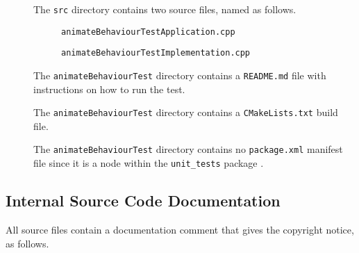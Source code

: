 \documentclass{CSSRforAfrica}
\newcommand{\checkboxChecked}{\fbox{\ding{51}}} %
\begin{document}
\begin{description}
\item[\checkboxChecked] The  {\small \verb+src+} directory contains two source files, named as follows.
\begin{description}
\item[\checkboxChecked] {\small \verb+animateBehaviourTestApplication.cpp+}  
\item[\checkboxChecked]  {\small \verb+animateBehaviourTestImplementation.cpp+}  
\end{description} 

\item[\checkboxChecked] The {\small \verb+animateBehaviourTest+} directory contains  a {\small \verb+README.md+} file with  instructions on how to run the test. 
\item[\checkboxChecked] The {\small \verb+animateBehaviourTest+} directory contains  a {\small \verb+CMakeLists.txt+} build file.
\item[\checkboxChecked] The {\small \verb+animateBehaviourTest+} directory contains  no {\small \verb+package.xml+} manifest file since it is a node within the {\small \verb+unit_tests+} package .

\end{description}


 
 
\subsection{Internal Source Code Documentation}
\label{subsection:animate_behaviour_test_documentation_standards}  

\noindent All source files contain a documentation comment that gives the copyright notice, as follows.
 
\end{document}

